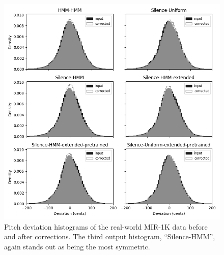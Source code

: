 \begin{figure}[t]
    \centering
    \includegraphics[width=\columnwidth]{figures/mir-1k-comparison.png}
    \caption{Pitch deviation histograms of the real-world MIR-1K data before and after corrections. The third output histogram, ``Silence-HMM'', again stands out as being the most symmetric.}
    \label{fig:mir-1k-comparison}
\end{figure}

